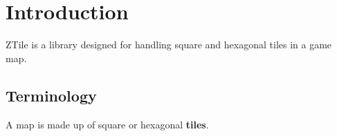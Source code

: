 \chapter{Introduction}

ZTile is a library designed for handling square and hexagonal tiles in a game map.

\section{Terminology}

A map is made up of square or hexagonal \textbf{tiles}.

